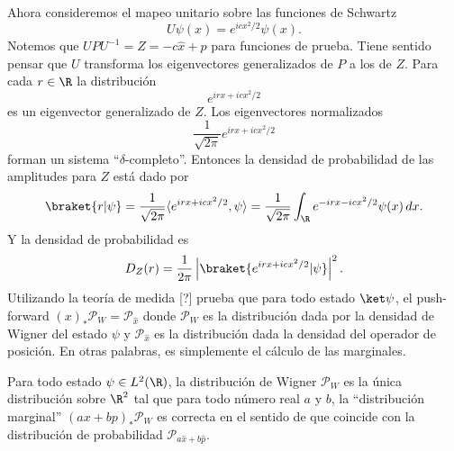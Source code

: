 Ahora consideremos el mapeo unitario sobre las funciones
  de Schwartz
  \[
    U\psi(x) = e^{icx^2 / 2} \psi(x).
  \] 
  Notemos que $UPU^{-1} = Z = -c \hat{x} + \hat{p}$ para
  funciones de prueba. Tiene sentido pensar que $U$ 
  transforma los eigenvectores generalizados de $P$ a los de
  $Z$. Para cada $r \in \R$ la distribución
  \[
    e^{irx + icx^2 / 2}
  \] 
  es un eigenvector generalizado de $Z$. Los eigenvectores
  normalizados
  \[
    \frac{1}{\sqrt{2\pi}} e^{irx + icx^2 / 2}
  \] 
  forman un sistema ``$\delta$-completo''. Entonces la
  densidad de probabilidad de las amplitudes para $Z$ está
  dado por
  \[
    \braket{r|\psi}
    = \frac{1}{\sqrt{2\pi}} \langle e^{irx + i cx^2 / 2},
    \psi \rangle
    = \frac{1}{\sqrt{2\pi}} \int_{\R} e^{-irx-icx^2 /
    2}\psi(x) \, dx.
  \] 
  Y la densidad de probabilidad es
  \[
    D_Z(r)
    = \frac{1}{2\pi} \left|
    \braket{e^{irx+icx^2 / 2}|\psi}
    \right|^2.
  \] 
  Utilizando la teoría de medida [?] prueba que para todo
  estado $\ket \psi$, el push-forward $(x)_* \mathcal P_W =
  \mathcal P_{\hat{x}}$ donde $\mathcal P_W$ es la
  distribución dada por la densidad de Wigner del estado
  $\psi$ y $\mathcal P_{\hat{x}}$ es la distribución dada la
  densidad del operador de posición. En otras palabras, es
  simplemente el cálculo de las marginales.

  \begin{proposition}
    Para todo estado $\psi \in L^2(\R)$, la distribución de
    Wigner $\mathcal P_W$ es la única distribución sobre
    $\R^{2}$ tal que para todo número real $a$ y $b$, la
    ``distribución marginal'' $(ax+bp)_{*} \mathcal P_W$ es
    correcta en el sentido de que coincide con la
    distribución de probabilidad $\mathcal P_{a \hat{x} + b
    \hat{p}}$.
  \end{proposition}

